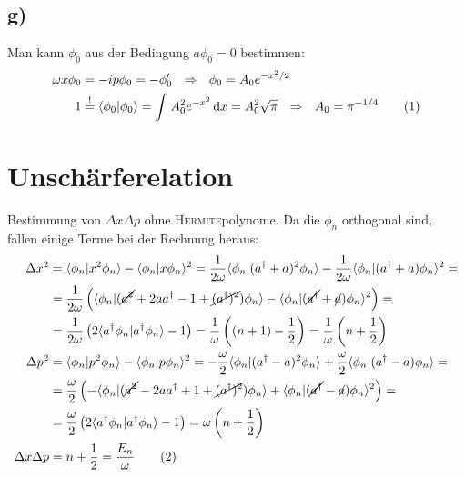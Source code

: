 \documentclass[a4paper,12pt]{article}
\newcommand\numberthis{\addtocounter{equation}{1}\tag{\theequation}}
\newcommand{\brak}{}
\newcommand{\intx}{}
\newcommand{\kla}{}
\begin{document}
\subsection*{g)}
Man kann $\phi_0$ aus der Bedingung $a\phi_0=0$ bestimmen:
\begin{align*}
\omega x\phi_0&=-ip\phi_0=-\phi_0'\ \ \Rightarrow\ \ \phi_0=A_0e^{-x^2/2} \\
1&\overset{!}{=}\brak\langle {\phi_0}| {\phi_0}\rangle=\intx\int_{ }^{ }A_0^2e^{-x^2}\,\mathrm{d}x=A_0^2\sqrt{\pi}\ \ \Rightarrow\ \ A_0=\pi^{-1/4}\numberthis\label{A_0}
\end{align*}
\section{Unschärferelation}
Bestimmung von $\Delta x \Delta p$ ohne \textsc{Hermite}polynome. Da die $\phi_n$ orthogonal sind, fallen einige Terme bei der Rechnung heraus:
\begin{align*}
\Delta x^2&=\brak\langle {\phi_n}| {x^2\phi_n}\rangle-\brak\langle {\phi_n}| {x\phi_n}\rangle^2=\frac{1}{2\omega}\brak\langle {\phi_n}| {(a^\dagger+a)^2\phi_n}\rangle-\frac{1}{2\omega}\brak\langle {\phi_n}| {(a^\dagger +a)\phi_n}\rangle^2= \\
&=\frac{1}{2\omega}\left(\brak\langle {\phi_n}| {(\cancel{a^2}+2aa^\dagger -1+\cancel{(a^\dagger)^2})\phi_n}\rangle-\brak\langle {\phi_n}| {(\cancel{a^\dagger}+\cancel{a})\phi_n}\rangle^2\right)= \\
&=\frac{1}{2\omega}\kla\left( {2\brak\langle {a^\dagger\phi_n}| {a^\dagger\phi_n}\rangle-1} \right)=\frac{1}{\omega}\kla\left( {(n+1)-\frac{1}{2}} \right)=\frac{1}{\omega}\kla\left( {n+\frac{1}{2}} \right) \\
\Delta p^2&=\brak\langle {\phi_n}| {p^2\phi_n}\rangle-\brak\langle {\phi_n}| {p\phi_n}\rangle^2=-\frac{\omega}{2}\brak\langle {\phi_n}| {(a^\dagger -a)^2\phi_n}\rangle+\frac{\omega}{2}\brak\langle {\phi_n}| {(a^\dagger -a)\phi_n}\rangle= \\
&=\frac{\omega}{2}\kla\left( {-\brak\langle {\phi_n}| {(\cancel{a^2}-2aa^\dagger+1+\cancel{(a^\dagger)^2})\phi_n}\rangle+\brak\langle {\phi_n}| {(\cancel{a^\dagger}-\cancel{a})\phi_n}\rangle^2} \right)= \\
&=\frac{\omega}{2}\kla\left( {2\brak\langle {a^\dagger\phi_n}| {a^\dagger\phi_n}\rangle-1} \right)=\omega\kla\left( {n+\frac{1}{2}} \right) \\
\Delta x\Delta p&=n+\frac{1}{2}=\frac{E_n}{\omega}\numberthis\label{Delta x Delta p}
\end{align*}
\end{document}
